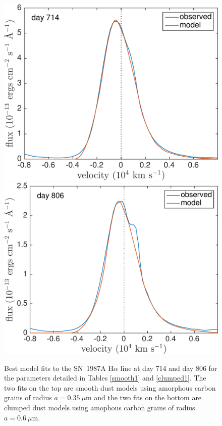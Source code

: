 \begin{figure}
\includegraphics[trim =25 0 0 0,clip=true,scale=0.4]{chapters/chapter5/images/clump_1/best_fit/d714Ha_new.pdf}
\includegraphics[trim =25 0 0 0,clip=true,scale=0.4]{chapters/chapter5/images/clump_1/best_fit/d806Ha_new.pdf}
\caption{Best model fits to the SN~1987A H$\alpha$ line at day 714 
and day 806 for the parameters detailed in Tables \ref{smooth1} and \ref{clumped1}. The two fits on the top are smooth dust models using amorphous carbon grains of radius $a=0.35~\mu$m and the two fits on the bottom are clumped dust models using amophous carbon grains of radius $a=0.6~\mu$m.}
\label{Ha}

\end{figure}

